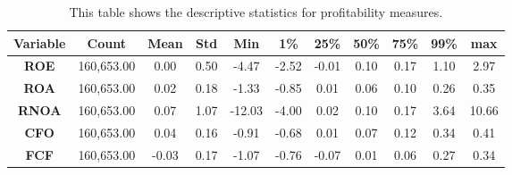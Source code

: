 {{\begin{table}[]
\begin{tabular}{|c|c|c|c|c|c|c|c|c|c|c|}
\hline
\textbf{Variable} & \textbf{Count} & \textbf{Mean} & \textbf{Std} & \textbf{Min} & \textbf{1\%} & \textbf{25\%} & \textbf{50\%} & \textbf{75\%} & \textbf{99\%} & \textbf{max} \\ \hline
\textbf{ROE}      & 160,653.00     & 0.00          & 0.50         & -4.47           & -2.52        & -0.01         & 0.10          & 0.17          & 1.10          & 2.97         \\ \hline
\textbf{ROA}      & 160,653.00     & 0.02          & 0.18         & -1.33           & -0.85        & 0.01          & 0.06          & 0.10          & 0.26          & 0.35         \\ \hline
\textbf{RNOA}     & 160,653.00     & 0.07          & 1.07         & -12.03          & -4.00        & 0.02          & 0.10          & 0.17          & 3.64          & 10.66        \\ \hline
\textbf{CFO}      & 160,653.00     & 0.04          & 0.16         & -0.91           & -0.68        & 0.01          & 0.07          & 0.12          & 0.34          & 0.41         \\ \hline
\textbf{FCF}      & 160,653.00     & -0.03         & 0.17         & -1.07           & -0.76        & -0.07         & 0.01          & 0.06          & 0.27          & 0.34         \\ \hline
\end{tabular}
\caption{This table shows the descriptive statistics for profitability measures.}
\label{tab:ProfitDescribe}
\end{table}


\begin{table}[htb!]
\centering
{}
\caption{This table shows the percentage increases of annual profitability in our sample.}
\label{tab:TargetPercentIncreases}
\end{table}


}}

